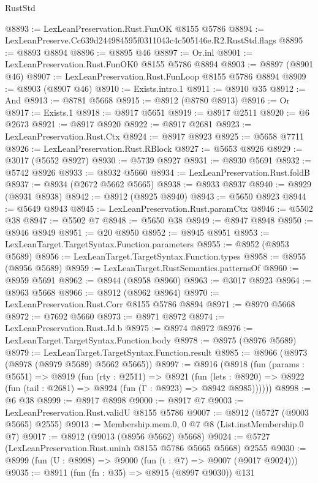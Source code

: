 \begin{lexlean}{RustStd}
\begin{coremodule}
@8893 := LexLeanPreservation.Rust.FunOK @8155 @5786
@8894 := LexLeanPreserve.Cc639d244984595f0311043c4c505146e.R2.RustStd.flags
@8895 := @8893 @8894
@8896 := @8895 @46
@8897 := Or.inl
@8901 := LexLeanPreservation.Rust.FunOK0 @8155 @5786 @8894
@8903 := @8897 (@8901 @46)
@8907 := LexLeanPreservation.Rust.FunLoop @8155 @5786 @8894
@8909 := @8903 (@8907 @46)
@8910 := Exists.intro.{1}
@8911 := @8910 @35
@8912 := And
@8913 := @8781 @5668
@8915 := @8912 (@8780 @8913)
@8916 := Or
@8917 := Exists.{1}
@8918 := @8917 @5651
@8919 := @8917 @2511
@8920 := @6 @2673
@8921 := @8917 @8920
@8922 := @8917 @2681
@8923 := LexLeanPreservation.Rust.Ctx
@8924 := @8917 @8923
@8925 := @5658 @7711
@8926 := LexLeanPreservation.Rust.RBlock
@8927 := @5653 @8926
@8929 := @3017 (@5652 @8927)
@8930 := @5739 @8927
@8931 := @8930 @5691
@8932 := @5742 @8926
@8933 := @8932 @5660
@8934 := LexLeanPreservation.Rust.foldB
@8937 := @8934 (@2672 @5662 @5665)
@8938 := @8933 @8937
@8940 := @8929 (@8931 @8938)
@8942 := @8912 (@8925 @8940)
@8943 := @5650 @8923
@8944 := @5649 @8943
@8945 := LexLeanPreservation.Rust.paramCtx
@8946 := @5502 @38
@8947 := @5502 @7
@8948 := @5650 @38
@8949 := @8947 @8948
@8950 := @8946 @8949
@8951 := @20 @8950
@8952 := @8945 @8951
@8953 := LexLeanTarget.TargetSyntax.Function.parameters
@8955 := @8952 (@8953 @5689)
@8956 := LexLeanTarget.TargetSyntax.Function.types
@8958 := @8955 (@8956 @5689)
@8959 := LexLeanTarget.RustSemantics.patternsOf
@8960 := @8959 @5691
@8962 := @8944 (@8958 @8960)
@8963 := @3017 @8923
@8964 := @8963 @5668
@8966 := @8912 (@8962 @8964)
@8970 := LexLeanPreservation.Rust.Corr @8155 @5786 @8894
@8971 := @8970 @5668
@8972 := @7692 @5660
@8973 := @8971 @8972
@8974 := LexLeanPreservation.Rust.Jd.b
@8975 := @8974 @8972
@8976 := LexLeanTarget.TargetSyntax.Function.body
@8978 := @8975 (@8976 @5689)
@8979 := LexLeanTarget.TargetSyntax.Function.result
@8985 := @8966 (@8973 (@8978 (@8979 @5689) @5662 @5665))
@8997 := @8916
    (@8918
      (fun (params : @5651) =>
      @8919
        (fun (rty : @2511) =>
        @8921
          (fun (lets : @8920) =>
          @8922 (fun (tail : @2681) => @8924 (fun (Γ : @8923) => @8942 @8985))))))
@8998 := @6 @38
@8999 := @8917 @8998
@9000 := @8917 @7
@9003 := LexLeanPreservation.Rust.validU @8155 @5786
@9007 := @8912 (@5727 (@9003 @5665) @2555)
@9013 := Membership.mem.{0, 0} @7 @8 (List.instMembership.{0} @7)
@9017 := @8912 (@9013 (@8956 @5662) @5668)
@9024 := @5727 (LexLeanPreservation.Rust.uninh @8155 @5786 @5665 @5668) @2555
@9030 := @8999 (fun (U : @8998) => @9000 (fun (t : @7) => @9007 (@9017 @9024)))
@9035 := @8911 (fun (fn : @35) => @8915 (@8997 @9030)) @131

\end{coremodule}
\end{lexlean}
